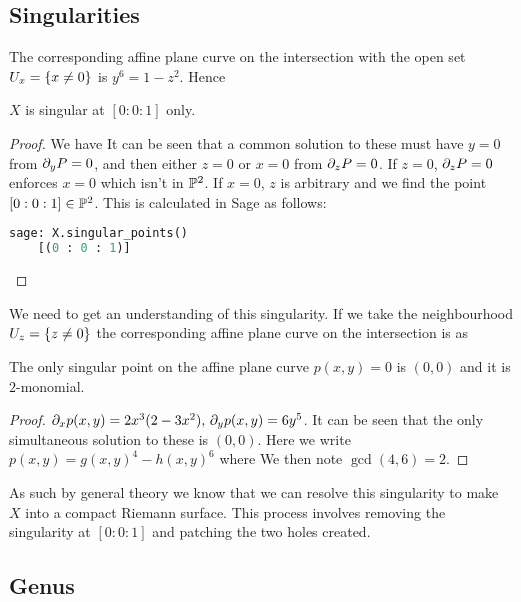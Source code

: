 \documentclass{article}
\begin{document}
\subsection{Singularities}

The corresponding affine plane curve on the intersection with the open set $U_x = \left\{ x \neq 0 \right\}$ is $y^6 = 1-z^2$. Hence 
\begin{prop}
	$X$ is singular at $[0:0:1]$ only. 
\end{prop}
\begin{proof}
	We have 
	It can be seen that a common solution to these must have $y=0$ from $\partial_y P=0$, and then either $z=0$  or $x=0$ from $\partial_zP=0$. If $z=0$, $\partial_zP=0$ enforces $x=0$ which isn't in $\mathbb{P}^2$. If $x=0$, $z$ is arbitrary and we find the point $[0:0:1] \in \mathbb{P}^2$. This is calculated in Sage as follows:
	\begin{lstlisting}[language=Python,frame=single]
	sage: X.singular_points()
	[(0 : 0 : 1)]
	\end{lstlisting}
\end{proof}
We need to get an understanding of this singularity. If we take the neighbourhood $U_z = \left\{ z \neq 0 \right\}$ the corresponding affine plane curve on the intersection is 
as 
\begin{prop}
	The only singular point on the affine plane curve $p(x,y)=0$ is $(0,0)$ and it is $2$-monomial. 
\end{prop}
\begin{proof}
	$\partial_x p(x,y) = 2x^3(2-3x^2), \, \partial_y p(x,y) = 6y^5$. It can be seen that the only simultaneous solution to these is  $(0,0)$. Here we write $p(x,y)=g(x,y)^4 - h(x,y)^6$ where
	We then note $\gcd(4,6) = 2$. 
\end{proof}
As such by general theory we know that we can resolve this singularity to make $X$ into a compact Riemann surface. This process involves removing the singularity at $[0:0:1]$ and patching the two holes created. 

\subsection{Genus}
\end{document}
